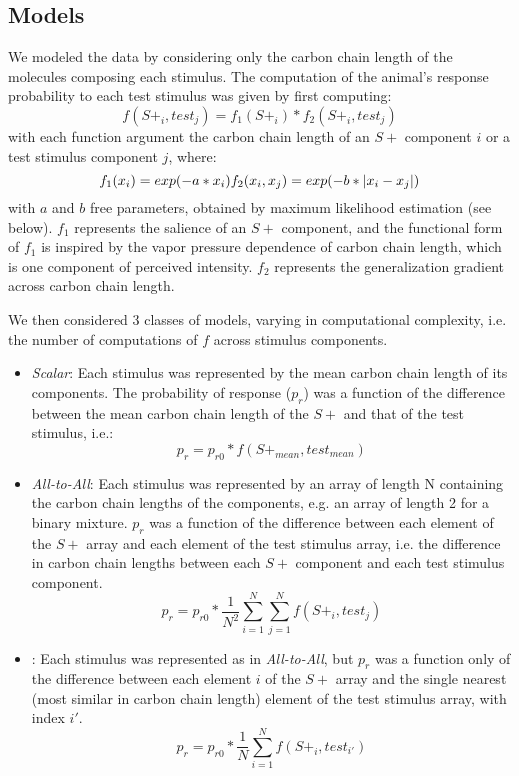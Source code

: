 \subsection*{Models}
\label{sec:methods_models}

We modeled the data by considering only the carbon chain length of the molecules composing each stimulus.  
The computation of the animal's response probability to each test stimulus was given by first computing: 
\begin{equation}
f(S+_i,test_j) = f_1(S+_i) * f_2(S+_i,test_j)
\end{equation}
with each function argument the carbon chain length of an $S+$ component $i$ or a test stimulus component $j$, where:
\begin{equation}
f_1(x_i) = exp(-a*x_i) \\
f_2(x_i,x_j) = exp(-b*|x_i-x_j|)
\end{equation}
with $a$ and $b$ free parameters, obtained by maximum likelihood estimation (see below).  
$f_1$ represents the salience of an $S+$ component, and the functional form of $f_1$ is inspired by the vapor pressure dependence of carbon chain length, which is one component of perceived intensity.  $f_2$ represents the generalization gradient across carbon chain length.  

We then considered 3 classes of models, varying in computational complexity, i.e. the number of computations of $f$ across stimulus components.  
\begin{itemize}
\item \textit{Scalar}: Each stimulus was represented by the mean carbon chain length of its components.  The probability of response ($p_r$) was a function of the difference between the mean carbon chain length of the $S+$ and that of the test stimulus, i.e.:
\begin{equation}
p_r = p_{r0} * f(S+_{mean},test_{mean})
\end{equation}
\item \textit{All-to-All}: Each stimulus was represented by an array of length N containing the carbon chain lengths of the components, e.g. an array of length 2 for a binary mixture. $p_r$ was a function of the difference between each element of the $S+$ array and each element of the test stimulus array, i.e. the difference in carbon chain lengths between each $S+$ component and each test stimulus component.  
\begin{equation}
p_r = p_{r0} * \frac{1}{N^2}\sum_{i=1}^{N}\sum_{j=1}^{N}f(S+_i,test_j)
\end{equation}
\item {}: Each stimulus was represented as in \textit{All-to-All}, but $p_r$ was a function only of the difference between each element $i$ of the $S+$ array and the single nearest (most similar in carbon chain length) element of the test stimulus array, with index $i'$.  
\begin{equation}
p_r = p_{r0} * \frac{1}{N}\sum_{i=1}^{N}f(S+_i,test_{i'})
\end{equation}
\end{itemize}

